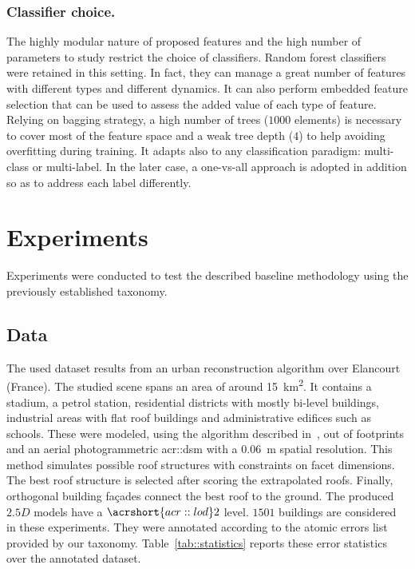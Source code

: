 \documentclass[runningheads]{llncs}
\begin{document}
\subsubsection{Classifier choice.} The highly modular nature of proposed features and the high number of parameters to study restrict the choice of classifiers. Random forest classifiers~\cite{breiman2001random} were retained in this setting. In fact, they can manage a great number of features with different types and different dynamics. It can also perform embedded feature selection that can be used to assess the added value of each type of feature. Relying on bagging strategy, a high number of trees ($1000$ elements) is necessary to cover most of the feature space and a weak tree depth ($4$) to help avoiding overfitting during training. It adapts also to any classification paradigm: multi-class or multi-label. In the later case, a one-vs-all approach is adopted in addition so as to address each label differently.
\section{Experiments}

Experiments were conducted to test the described baseline methodology using the previously established taxonomy.
\subsection{Data}

The used dataset results from an urban reconstruction algorithm over Elancourt (France). The studied scene spans an area of around \SI{15}{\km\squared}. It contains a stadium, a petrol station, residential districts with mostly bi-level buildings, industrial areas with flat roof buildings and administrative edifices such as schools. These were modeled, using the algorithm described in~\cite{Durupt2006}, out of footprints and an aerial photogrammetric \acrshort{acr::dsm} with a \SI{0.06}{\m} spatial resolution. This method simulates possible roof structures with constraints on facet dimensions. The best roof structure is selected after scoring the extrapolated roofs. Finally, orthogonal building fa\c{c}ades connect the best roof to the ground. The produced $2.5D$ models have a $\acrshort{acr::lod}2$ level.  $1501$ buildings are considered in these experiments. They were annotated according to the atomic errors list provided by our taxonomy. Table~\ref{tab::statistics} reports these error statistics over the annotated dataset.
\end{document}
